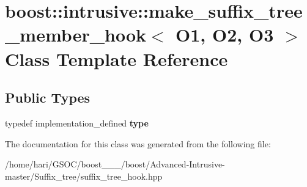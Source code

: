 \hypertarget{classboost_1_1intrusive_1_1make__suffix__tree__member__hook}{}\section{boost\+:\+:intrusive\+:\+:make\+\_\+suffix\+\_\+tree\+\_\+member\+\_\+hook$<$ O1, O2, O3 $>$ Class Template Reference}
\label{classboost_1_1intrusive_1_1make__suffix__tree__member__hook}
\subsection*{Public Types}
\begin{DoxyCompactItemize}
\item 
\mbox{\label{classboost_1_1intrusive_1_1make__suffix__tree__member__hook_ad60aeb75c91f8af7d26f667cecb0b8d9}} 
typedef implementation\+\_\+defined {\bfseries type}
\end{DoxyCompactItemize}


The documentation for this class was generated from the following file\+:\begin{DoxyCompactItemize}
\item 
/home/hari/\+G\+S\+O\+C/boost\+\_\+\_\+\_/boost/\+Advanced-\/\+Intrusive-\/master/\+Suffix\+\_\+tree/suffix\+\_\+tree\+\_\+hook.\+hpp\end{DoxyCompactItemize}
